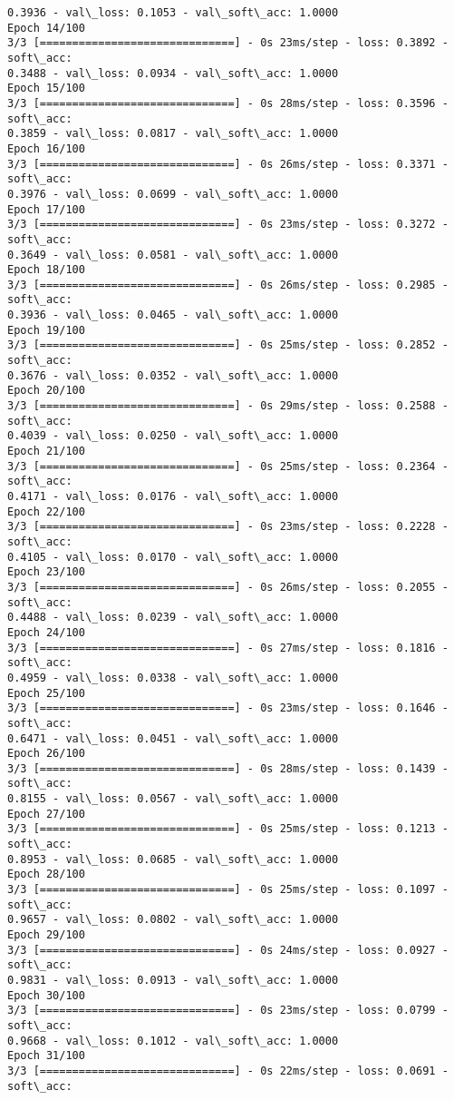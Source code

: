 \documentclass[11pt]{article}
\begin{document}
\begin{Verbatim}[commandchars=\\\{\}]
0.3936 - val\_loss: 0.1053 - val\_soft\_acc: 1.0000
Epoch 14/100
3/3 [==============================] - 0s 23ms/step - loss: 0.3892 - soft\_acc:
0.3488 - val\_loss: 0.0934 - val\_soft\_acc: 1.0000
Epoch 15/100
3/3 [==============================] - 0s 28ms/step - loss: 0.3596 - soft\_acc:
0.3859 - val\_loss: 0.0817 - val\_soft\_acc: 1.0000
Epoch 16/100
3/3 [==============================] - 0s 26ms/step - loss: 0.3371 - soft\_acc:
0.3976 - val\_loss: 0.0699 - val\_soft\_acc: 1.0000
Epoch 17/100
3/3 [==============================] - 0s 23ms/step - loss: 0.3272 - soft\_acc:
0.3649 - val\_loss: 0.0581 - val\_soft\_acc: 1.0000
Epoch 18/100
3/3 [==============================] - 0s 26ms/step - loss: 0.2985 - soft\_acc:
0.3936 - val\_loss: 0.0465 - val\_soft\_acc: 1.0000
Epoch 19/100
3/3 [==============================] - 0s 25ms/step - loss: 0.2852 - soft\_acc:
0.3676 - val\_loss: 0.0352 - val\_soft\_acc: 1.0000
Epoch 20/100
3/3 [==============================] - 0s 29ms/step - loss: 0.2588 - soft\_acc:
0.4039 - val\_loss: 0.0250 - val\_soft\_acc: 1.0000
Epoch 21/100
3/3 [==============================] - 0s 25ms/step - loss: 0.2364 - soft\_acc:
0.4171 - val\_loss: 0.0176 - val\_soft\_acc: 1.0000
Epoch 22/100
3/3 [==============================] - 0s 23ms/step - loss: 0.2228 - soft\_acc:
0.4105 - val\_loss: 0.0170 - val\_soft\_acc: 1.0000
Epoch 23/100
3/3 [==============================] - 0s 26ms/step - loss: 0.2055 - soft\_acc:
0.4488 - val\_loss: 0.0239 - val\_soft\_acc: 1.0000
Epoch 24/100
3/3 [==============================] - 0s 27ms/step - loss: 0.1816 - soft\_acc:
0.4959 - val\_loss: 0.0338 - val\_soft\_acc: 1.0000
Epoch 25/100
3/3 [==============================] - 0s 23ms/step - loss: 0.1646 - soft\_acc:
0.6471 - val\_loss: 0.0451 - val\_soft\_acc: 1.0000
Epoch 26/100
3/3 [==============================] - 0s 28ms/step - loss: 0.1439 - soft\_acc:
0.8155 - val\_loss: 0.0567 - val\_soft\_acc: 1.0000
Epoch 27/100
3/3 [==============================] - 0s 25ms/step - loss: 0.1213 - soft\_acc:
0.8953 - val\_loss: 0.0685 - val\_soft\_acc: 1.0000
Epoch 28/100
3/3 [==============================] - 0s 25ms/step - loss: 0.1097 - soft\_acc:
0.9657 - val\_loss: 0.0802 - val\_soft\_acc: 1.0000
Epoch 29/100
3/3 [==============================] - 0s 24ms/step - loss: 0.0927 - soft\_acc:
0.9831 - val\_loss: 0.0913 - val\_soft\_acc: 1.0000
Epoch 30/100
3/3 [==============================] - 0s 23ms/step - loss: 0.0799 - soft\_acc:
0.9668 - val\_loss: 0.1012 - val\_soft\_acc: 1.0000
Epoch 31/100
3/3 [==============================] - 0s 22ms/step - loss: 0.0691 - soft\_acc:

\end{Verbatim}
\end{document}
